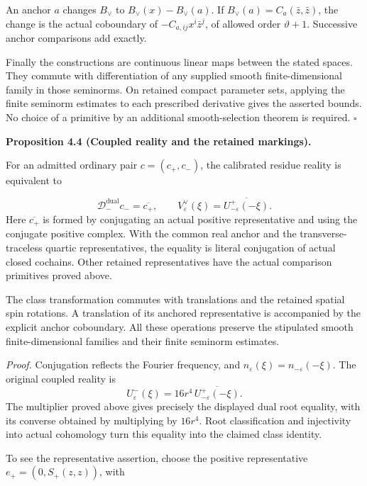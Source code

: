 \documentclass[
  english,
  11pt,
  reqno]{amsart}
\makeatletter
\newcommand{\pandocstatementheading}[1]{%
  \par\addpenalty{\@beginparpenalty}%
  \addvspace{.5\baselineskip plus .2\baselineskip minus .2\baselineskip}%
  {\normalfont\bfseries #1\par}%
  \nobreak\@afterindenttrue\@afterheading
}
\makeatother
\begin{document}
An anchor \(a\) changes \(B_\vee\) to \(B_\vee(x)-B_\vee(a)\). If
\(B_\vee(a)=C_a(\bar z,\bar z)\), the change is the actual coboundary of
\(-C_{a,ij}x^i\bar z^j\), of allowed order \(\vartheta+1\). Successive
anchor comparisons add exactly.

Finally the constructions are continuous linear maps between the stated
spaces. They commute with differentiation of any supplied smooth
finite-dimensional family in those seminorms. On retained compact
parameter sets, applying the finite seminorm estimates to each
prescribed derivative gives the asserted bounds. No choice of a
primitive by an additional smooth-selection theorem is required.
\hfill\(\square\)

\pandocstatementheading{\leavevmode{}\label{prop:online-negative-dual-reality-and-markings}Proposition 4.4 (Coupled reality and the retained markings).}

For an admitted ordinary pair \(c=(c_+,c_-)\), the calibrated residue
reality is equivalent to

\label{eq:online-negative-dual-coupled-reality} \[
\mathcal D_-^{\mathrm{dual}}c_-=\overline{c_+},
\qquad
V^\vee_\varepsilon(\xi)
=\overline{U^+_{-\varepsilon}(-\xi)} .
\] Here \(\overline{c_+}\) is formed by conjugating an actual positive
representative and using the conjugate positive complex. With the common
real anchor and the transverse-traceless quartic representatives, the
equality is literal conjugation of actual closed cochains. Other
retained representatives have the actual comparison primitives proved
above.

The class transformation commutes with translations and the retained
spatial spin rotations. A translation of its anchored representative is
accompanied by the explicit anchor coboundary. All these operations
preserve the stipulated smooth finite-dimensional families and their
finite seminorm estimates.

\emph{Proof.} Conjugation reflects the Fourier frequency, and
\(n_\varepsilon(\xi)=n_{-\varepsilon}(-\xi)\). The original coupled
reality is \[
U^-_\varepsilon(\xi)
=16r^4\,\overline{U^+_{-\varepsilon}(-\xi)}.
\] The multiplier proved above gives precisely the displayed dual root
equality, with its converse obtained by multiplying by \(16r^4\). Root
classification and injectivity into actual cohomology turn this equality
into the claimed class identity.

To see the representative assertion, choose the positive representative
\(e_+=(0,S_+(z,z))\), with
\end{document}
